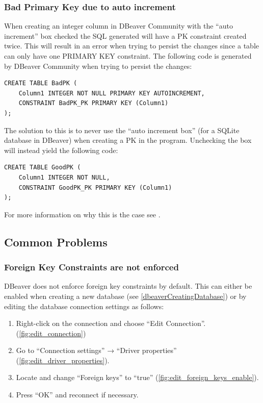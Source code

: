 \documentclass[a4paper,11pt,oneside]{article}
\begin{document}
\begin{sloppypar}
\subsubsection{Bad Primary Key due to auto increment}
When creating an integer column in DBeaver Community with the ``auto increment'' box checked the SQL generated will have a PK constraint created twice. This will result in an error when trying to persist the changes since a table can only have one PRIMARY KEY constraint. The following code is generated by DBeaver Community when trying to persist the changes:
\begin{lstlisting}[caption={Bad Primary Key due to auto increment in DBeaver}]
CREATE TABLE BadPK (
	Column1 INTEGER NOT NULL PRIMARY KEY AUTOINCREMENT,
	CONSTRAINT BadPK_PK PRIMARY KEY (Column1)
);
\end{lstlisting}
The solution to this is to never use the ``auto increment box'' (for a SQLite database in DBeaver) when creating a PK in the program. Unchecking the box will instead yield the following code:
\begin{lstlisting}[caption={Ok Primary Key in DBeaver if auto increment is unchecked}]
CREATE TABLE GoodPK (
	Column1 INTEGER NOT NULL,
	CONSTRAINT GoodPK_PK PRIMARY KEY (Column1)
);
\end{lstlisting}
For more information on why this is the case see \cite{dbeaver_issue_18491}.

\subsection{Common Problems}
\label{dbeaverCommonProblems}

\subsubsection{Foreign Key Constraints are not enforced}
DBeaver does not enforce foreign key constraints by default. This can either be enabled when creating a new database (see \autoref{dbeaverCreatingDatabase}) or by editing the database connection settings as follows:
\begin{enumerate}
    \item Right-click on the connection and choose ``Edit Connection''. (\autoref{fig:edit_connection})
    \item Go to ``Connection settings'' → ``Driver properties'' (\autoref{fig:edit_driver_properties}).
    \item Locate and change ``Foreign keys'' to ``true'' (\autoref{fig:edit_foreign_keys_enable}).
    \item Press ``OK'' and reconnect if necessary.
\end{enumerate}


\end{sloppypar}
\end{document}
